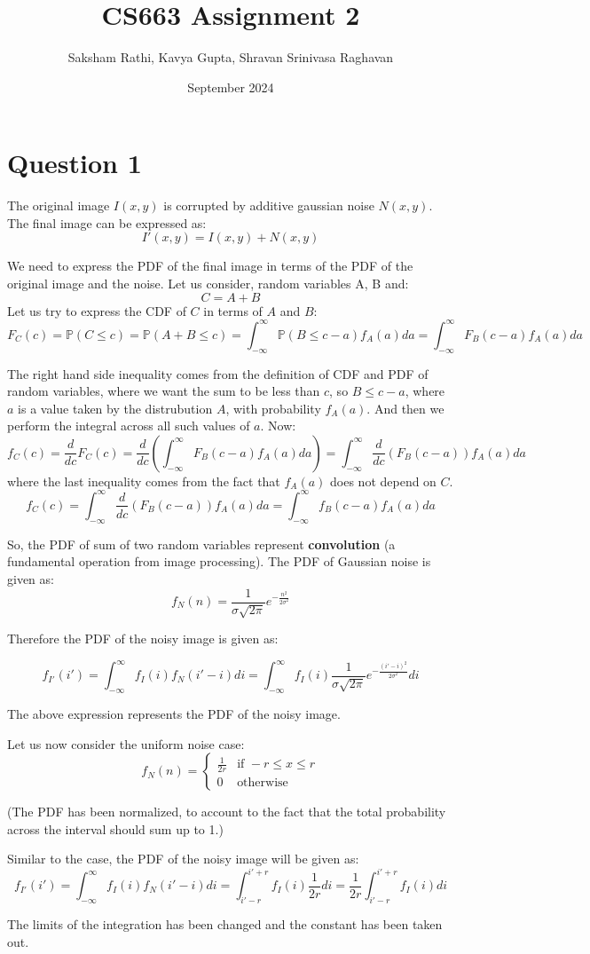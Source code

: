 \documentclass[12pt]{article}
\title{{\bf CS663 Assignment 2}}
\author{Saksham Rathi, Kavya Gupta, Shravan Srinivasa Raghavan}
\date{September 2024}
\begin{document}
\maketitle
\clearpage
\tableofcontents
\clearpage
\section*{Question 1}
The original image $I(x, y)$ is corrupted by additive gaussian noise $N(x, y)$. The final image can be expressed as:
\[I'(x, y) = I(x, y) + N(x, y)\]

We need to express the PDF of the final image in terms of the PDF of the original image and the noise. Let us consider, random variables A, B and:
\[C = A + B\]
Let us try to express the CDF of $C$ in terms of $A$ and $B$:
\[F_C(c) = \mathbb{P}(C \leq c) = \mathbb{P}(A+ B \leq c) = \int_{-\infty}^\infty \mathbb{P}(B \leq c - a)f_A(a)da = \int_{-\infty}^\infty F_B(c-a)f_A(a)da\]

The right hand side inequality comes from the definition of CDF and PDF of random variables, where we want the sum to be less than $c$, so $B\leq c-a$, where $a$ is a value taken by the distrubution $A$, with probability $f_A(a)$. And then we perform the integral across all such values of $a$. Now:
\[f_C(c) = \frac{d}{dc}F_C(c) = \frac{d}{dc}(\int_{-\infty}^\infty F_B(c-a)f_A(a)da) = \int_{-\infty}^\infty \frac{d}{dc}(F_B(c-a))f_A(a)da\]
where the last inequality comes from the fact that $f_A(a)$ does not depend on $C$.
\[f_C(c) = \int_{-\infty}^\infty \frac{d}{dc}(F_B(c-a))f_A(a)da = \int_{-\infty}^\infty f_B(c-a)f_A(a)da\]

So, the PDF of sum of two random variables represent \textbf{convolution} (a fundamental operation from image processing). The PDF of Gaussian noise is given as:
\[f_N(n) = \frac{1}{\sigma\sqrt{2\pi}}e^{-\frac{n^2}{2\sigma^2}}\]

Therefore the PDF of the noisy image is given as:

\[f_{I'}(i') = \int_{-\infty}^\infty f_I(i)f_N(i'-i)di = \int_{-\infty}^\infty f_I(i)\frac{1}{\sigma\sqrt{2\pi}}e^{-\frac{(i'-i)^2}{2\sigma^2}}di\]

The above expression represents the PDF of the noisy image.


Let us now consider the uniform noise case:
\[f_N(n) = 
\begin{cases} 
    \frac{1}{2r} & \text{if } -r \leq x \leq r \\
    0  & \text{otherwise}
\end{cases}\]

(The PDF has been normalized, to account to the fact that the total probability across the interval should sum up to 1.)


Similar to the case, the PDF of the noisy image will be given as:
\[f_{I'}(i') = \int_{-\infty}^\infty f_I(i)f_N(i'-i)di = \int_{i'-r}^{i'+r} f_I(i)\frac{1}{2r}di = \frac{1}{2r}\int_{i'-r}^{i'+r} f_I(i)di\]


The limits of the integration has been changed and the constant has been taken out.
\end{document}

